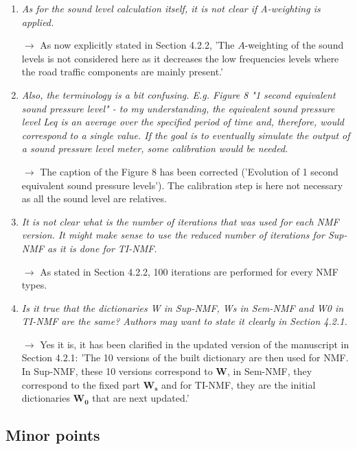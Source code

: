 \documentclass[10pt]{article}
\begin{document}
\begin{enumerate}
\item \emph{As for the sound level calculation itself, it is not clear if A-weighting is applied.}

$\rightarrow$ As now explicitly stated in Section 4.2.2, 'The $A$-weighting of the sound levels is not considered here as it decreases the low frequencies levels where the road traffic components are mainly present.'

\item \emph{Also, the terminology is a bit confusing. E.g. Figure 8 "1 second equivalent sound pressure level" - to my understanding, the equivalent sound pressure level Leq is an average over the specified period of time and, therefore, would correspond to a single value. If the goal is to eventually simulate the output of a sound pressure level meter, some calibration would be needed.}

$\rightarrow$ The caption of the Figure 8 has been corrected ('Evolution of 1 second equivalent sound pressure levels'). The calibration step is here not necessary as all the sound level are relatives.

\item \emph{It is not clear what is the number of iterations that was used for each NMF version. It might make sense to use the reduced number of iterations for Sup-NMF as it is done for TI-NMF.}

$\rightarrow$ As stated in Section 4.2.2, 100 iterations are performed for every NMF types.

\item \emph{Is it true that the dictionaries W in Sup-NMF, Ws in Sem-NMF and W0 in TI-NMF are the same? Authors may want to state it clearly in Section 4.2.1.}

$\rightarrow$ Yes it is, it has been clarified in the updated version of the manuscript in Section 4.2.1: 'The 10 versions of the built dictionary are then used for NMF. In Sup-NMF, these 10 versions correspond to $\mathbf{W}$, in Sem-NMF, they correspond to the fixed part $\mathbf{W_s}$ and for TI-NMF, they are the initial dictionaries $\mathbf{W_0}$ that are next updated.'

\end{enumerate}
\subsection{Minor points}
\end{document}
